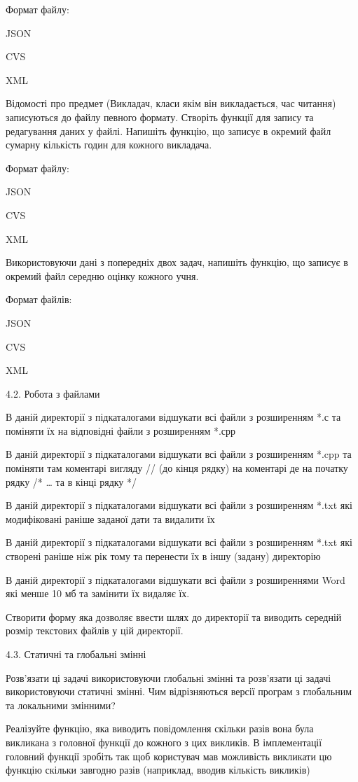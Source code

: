 \documentclass[]{article}
\begin{document}
Формат файлу:

JSON

CVS

XML

Відомості про предмет (Викладач, класи якім він викладається, час
читання) записуються до файлу певного формату. Створіть функції для
запису та редагування даних у файлі. Напишіть функцію, що записує в
окремий файл сумарну кількість годин для кожного викладача.

Формат файлу:

JSON

CVS

XML

Використовуючи дані з попередніх двох задач, напишіть функцію, що
записує в окремий файл середню оцінку кожного учня.

Формат файлів:

JSON

CVS

XML

4.2. Робота з файлами

В даній директорії з підкаталогами відшукати всі файли з розширенням *.с
та поміняти їх на відповідні файли з розширенням *.срр

В даній директорії з підкаталогами відшукати всі файли з розширенням
*.cpp та поміняти там коментарі вигляду // (до кінця рядку) на коментарі
де на початку рядку /* \ldots{} та в кінці рядку */

В даній директорії з підкаталогами відшукати всі файли з розширенням
*.txt які модифіковані раніше заданої дати та видалити їх

В даній директорії з підкаталогами відшукати всі файли з розширенням
*.txt які створені раніше ніж рік тому та перенести їх в іншу (задану)
директорію

В даній директорії з підкаталогами відшукати всі файли з розширеннями
Word які менше 10 мб та замінити їх видаляє їх.

Створити форму яка дозволяє ввести шлях до директорії та виводить
середній розмір текстових файлів у цій директорії.

4.3. Статичні та глобальні змінні

Розв'язати ці задачі використовуючи глобальні змінні та розв'язати ці
задачі використовуючи статичні змінні. Чим відрізняються версії програм
з глобальним та локальними змінними?

Реалізуйте функцію, яка виводить повідомлення скільки разів вона була
викликана з головної функції до кожного з цих викликів. В імплементації
головний функції зробіть так щоб користувач мав можливість викликати цю
функцію скільки завгодно разів (наприклад, вводив кількість викликів)
\end{document}
